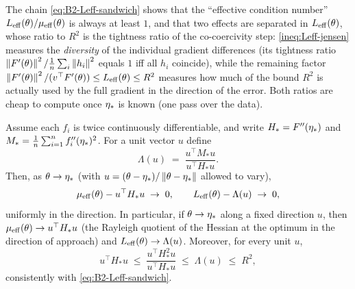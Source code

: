 \begin{remark}
The chain \eqref{eq:B2-Leff-sandwich} shows that the ``effective condition number'' $L_{\mathrm{eff}}(\theta)/\mu_{\mathrm{eff}}(\theta)$
is always at least $1$, and that two effects are separated in $L_{\mathrm{eff}}(\theta)$, whose ratio to $R^2$ is the tightness ratio
of the co-coercivity step:
\eqref{ineq:Leff-jensen} measures the \emph{diversity} of the individual gradient differences
(its tightness ratio $\left\|F'(\theta)\right\|^2/\frac1n\sum_i\left\|h_i\right\|^2$ equals $1$ iff all $h_i$ coincide),
while the remaining factor $\left\|F'(\theta)\right\|^2/(v^\top F'(\theta))\le L_{\mathrm{eff}}(\theta)\le R^2$ measures how much
of the bound $R^2$ is actually used by the full gradient in the direction of the error. Both ratios are cheap to
compute once $\eta_\ast$ is known (one pass over the data).
\end{remark}

\begin{proposition}\label{prop:B2-limits}
Assume each $f_i$ is twice continuously differentiable, and write $H_\ast=F''(\eta_\ast)$ and
$M_\ast=\frac1n\sum_{i=1}^nf_i''(\eta_\ast)^2$. For a unit vector $u$ define
\[
\Lambda(u)\;=\;\frac{u^\top M_\ast u}{u^\top H_\ast u}.
\]
Then, as $\theta\to\eta_\ast$ (with $u=(\theta-\eta_\ast)/\left\|\theta-\eta_\ast\right\|$ allowed to vary),
\[
\mu_{\mathrm{eff}}(\theta)-u^\top H_\ast u\;\to\;0,\qquad L_{\mathrm{eff}}(\theta)-\Lambda(u)\;\to\;0 ,
\]
uniformly in the direction. In particular, if $\theta\to\eta_\ast$ along a fixed direction $u$, then
$\mu_{\mathrm{eff}}(\theta)\to u^\top H_\ast u$ (the Rayleigh quotient of the Hessian at the optimum in the direction of
approach) and $L_{\mathrm{eff}}(\theta)\to\Lambda(u)$. Moreover, for every unit $u$,
\begin{equation}\label{eq:B2-Lambda-bounds}
u^\top H_\ast u\;\le\;\frac{u^\top H_\ast^2u}{u^\top H_\ast u}\;\le\;\Lambda(u)\;\le\;R^2 ,
\end{equation}
consistently with \eqref{eq:B2-Leff-sandwich}.
\end{proposition}

